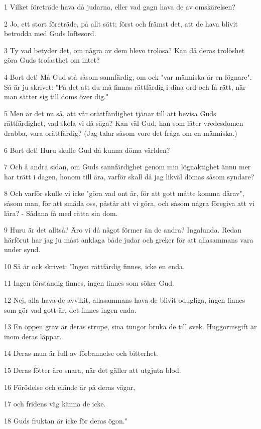 \par 1 Vilket företräde hava då judarna, eller vad gagn hava de av omskärelsen?
\par 2 Jo, ett stort företräde, på allt sätt; först och främst det, att de hava blivit betrodda med Guds löftesord.
\par 3 Ty vad betyder det, om några av dem blevo trolösa? Kan då deras trolöshet göra Guds trofasthet om intet?
\par 4 Bort det! Må Gud stå såsom sannfärdig, om ock "var människa är en lögnare". Så är ju skrivet: "På det att du må finnas rättfärdig i dina ord och få rätt, när man sätter sig till doms över dig."
\par 5 Men är det nu så, att vår orättfärdighet tjänar till att bevisa Guds rättfärdighet, vad skola vi då säga? Kan väl Gud, han som låter vredesdomen drabba, vara orättfärdig? (Jag talar såsom vore det fråga om en människa.)
\par 6 Bort det! Huru skulle Gud då kunna döma världen?
\par 7 Och å andra sidan, om Guds sannfärdighet genom min lögnaktighet ännu mer har trätt i dagen, honom till ära, varför skall då jag likväl dömas såsom syndare?
\par 8 Och varför skulle vi icke "göra vad ont är, för att gott måtte komma därav", såsom man, för att smäda oss, påstår att vi göra, och såsom några föregiva att vi lära? - Sådana få med rätta sin dom.
\par 9 Huru är det alltså? Äro vi då något förmer än de andra? Ingalunda. Redan härförut har jag ju måst anklaga både judar och greker för att allasammans vara under synd.
\par 10 Så är ock skrivet: "Ingen rättfärdig finnes, icke en enda.
\par 11 Ingen förståndig finnes, ingen finnes som söker Gud.
\par 12 Nej, alla hava de avvikit, allasammans hava de blivit odugliga, ingen finnes som gör vad gott är, det finnes ingen enda.
\par 13 En öppen grav är deras strupe, sina tungor bruka de till svek. Huggormsgift är inom deras läppar.
\par 14 Deras mun är full av förbannelse och bitterhet.
\par 15 Deras fötter äro snara, när det gäller att utgjuta blod.
\par 16 Förödelse och elände är på deras vägar,
\par 17 och fridens väg känna de icke.
\par 18 Guds fruktan är icke för deras ögon."
